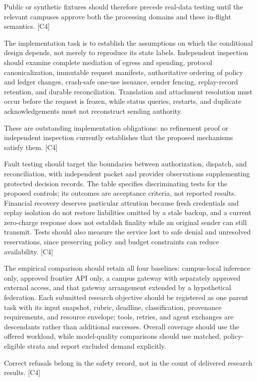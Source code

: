\documentclass[11pt]{article}
\begin{document}
Public or synthetic fixtures should therefore precede real-data testing until the relevant campuses approve both the processing domains and these in-flight semantics. [C4]

The implementation task is to establish the assumptions on which the conditional design depends, not merely to reproduce its state labels. Independent inspection should examine complete mediation of egress and spending, protocol canonicalization, immutable request manifests, authoritative ordering of policy and ledger changes, crash-safe one-use issuance, sender fencing, replay-record retention, and durable reconciliation. Translation and attachment resolution must occur before the request is frozen, while status queries, restarts, and duplicate acknowledgements must not reconstruct sending authority.

These are outstanding implementation obligations: no refinement proof or independent inspection currently establishes that the proposed mechanisms satisfy them. [C4]

Fault testing should target the boundaries between authorization, dispatch, and reconciliation, with independent packet and provider observations supplementing protected decision records. The table specifies discriminating tests for the proposed controls; its outcomes are acceptance criteria, not reported results. Financial recovery deserves particular attention because fresh credentials and replay isolation do not restore liabilities omitted by a stale backup, and a current zero-charge response does not establish finality while an original sender can still transmit. Tests should also measure the service lost to safe denial and unresolved reservations, since preserving policy and budget constraints can reduce availability. [C4]

The empirical comparison should retain all four baselines: campus-local inference only, approved frontier API only, a campus gateway with separately approved external access, and that gateway arrangement extended by a hypothetical federation. Each submitted research objective should be registered as one parent task with its input snapshot, rubric, deadline, classification, provenance requirements, and resource envelope; tools, retries, and agent exchanges are descendants rather than additional successes. Overall coverage should use the offered workload, while model-quality comparisons should use matched, policy-eligible strata and report excluded demand explicitly.

Correct refusals belong in the safety record, not in the count of delivered research results. [C4]
\end{document}
